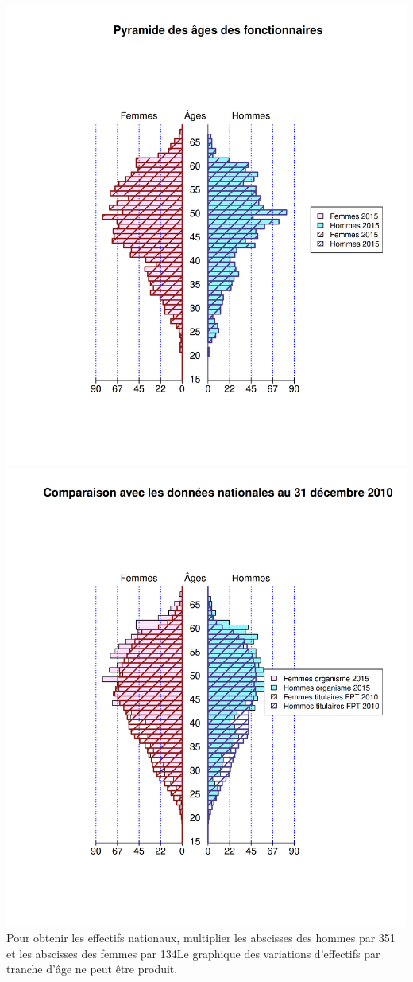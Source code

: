 \includegraphics{altair_files/figure-latex/unnamed-chunk-17-1.png}
\includegraphics{altair_files/figure-latex/unnamed-chunk-17-2.png} Pour
obtenir les effectifs nationaux, multiplier les abscisses des hommes par
351 et les abscisses des femmes par 134\newpage Le graphique des
variations d'effectifs par tranche d'âge ne peut être produit.

